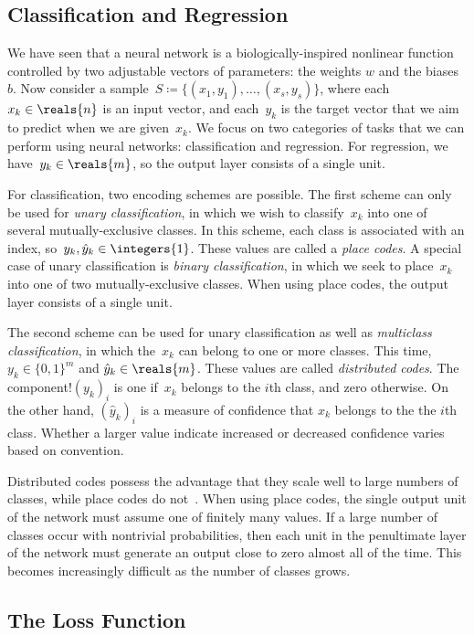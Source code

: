 \documentclass[11pt,a4paper]{article}
\numberwithin{equation}{section}
\begin{document}
\subsection{Classification and Regression}

We have seen that a neural network is a biologically-inspired nonlinear function
controlled by two adjustable vectors of parameters: the weights $w$ and the
biases~$b$. Now consider a sample~$S \coloneqq \{(x_1, y_1), \ldots, (x_s,
y_s)\}$, where each~$x_k \in \reals{n}$ is an input vector, and each~$y_k$ is
the target vector that we aim to predict when we are given~$x_k$. We focus on
two categories of tasks that we can perform using neural networks:
classification and regression. For regression, we have~$y_k \in \reals{m}$, so
the output layer consists of a single unit.

For classification, two encoding schemes are possible. The first scheme can only
be used for \emph{unary classification}, in which we wish to classify~$x_k$ into
one of several mutually-exclusive classes. In this scheme, each class is
associated with an index, so~$y_k, \hat{y}_k \in \integers{1}$. These values are
called a \emph{place codes}. A special case of unary classification is
\emph{binary classification}, in which we seek to place~$x_k$ into one of two
mutually-exclusive classes. When using place codes, the output layer consists of
a single unit.

The second scheme can be used for unary classification as well as
\emph{multiclass classification}, in which the~$x_k$ can belong to one or more
classes. This time,~$y_k \in \{0, 1\}^m$ and $\hat{y}_k \in \reals{m}$. These
values are called \emph{distributed codes}. The component!$(y_k)_i$ is one
if~$x_k$ belongs to the $i$th class, and zero otherwise. On the other hand,
$(\hat{y}_k)_i$ is a measure of confidence that $x_k$ belongs to the the $i$th
class. Whether a larger value indicate increased or decreased confidence varies
based on convention.

Distributed codes possess the advantage that they scale well to large
numbers of classes, while place codes do not~\citep{lecun-98b}. When using place
codes, the single output unit of the network must assume one of finitely many
values. If a large number of classes occur with nontrivial probabilities, then
each unit in the penultimate layer of the network must generate an output close
to zero almost all of the time. This becomes increasingly difficult as the
number of classes grows.

\subsection{The Loss Function}
\end{document}
